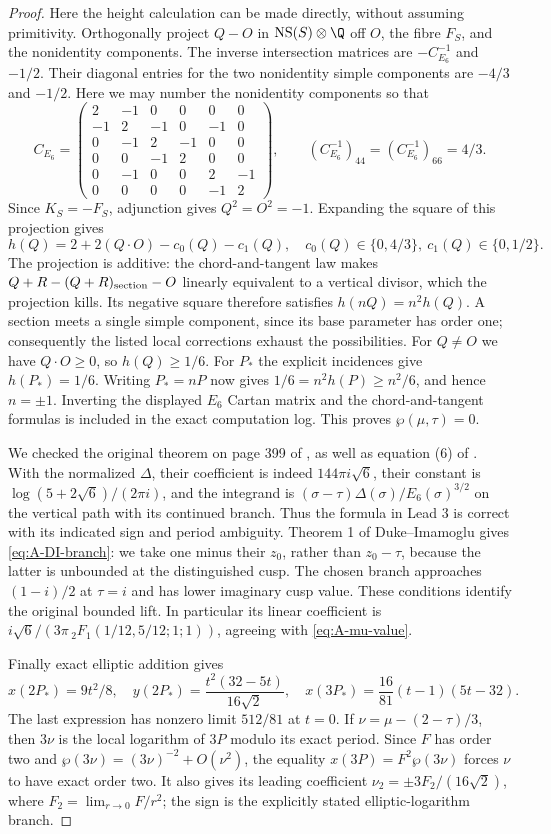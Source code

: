 \begin{proof}
Here the height calculation can be made directly, without assuming
primitivity.  Orthogonally project $Q-O$ in
$\operatorname{NS}(S)\otimes\Q$ off $O$, the fibre $F_S$, and the
nonidentity components.  The inverse intersection matrices are
$-C_{E_6}^{-1}$ and $-1/2$.  Their diagonal entries for the two
nonidentity simple components are $-4/3$ and $-1/2$.
Here we may number the nonidentity components so that
\[
C_{E_6}=\begin{pmatrix}
2&-1&0&0&0&0\\
-1&2&-1&0&-1&0\\
0&-1&2&-1&0&0\\
0&0&-1&2&0&0\\
0&-1&0&0&2&-1\\
0&0&0&0&-1&2
\end{pmatrix},\qquad
(C_{E_6}^{-1})_{44}=(C_{E_6}^{-1})_{66}=4/3.
\]
Since $K_S=-F_S$, adjunction gives $Q^2=O^2=-1$.  Expanding the
square of this projection gives
\[
h(Q)=2+2(Q\cdot O)-c_0(Q)-c_1(Q),\quad
c_0(Q)\in\{0,4/3\},\ c_1(Q)\in\{0,1/2\}.
\]
The projection is additive: the chord-and-tangent law makes
$Q+R-(Q+R)_{\rm section}-O$ linearly equivalent to a vertical
divisor, which the projection kills.  Its negative square therefore
satisfies $h(nQ)=n^2h(Q)$.  A section meets a single simple
component, since its base parameter has order one; consequently
the listed local corrections exhaust the possibilities.
For $Q\ne O$ we have $Q\cdot O\ge0$, so $h(Q)\ge1/6$.
For $P_*$ the explicit incidences give $h(P_*)=1/6$.
Writing $P_*=nP$ now gives $1/6=n^2h(P)\ge n^2/6$, and hence
$n=\pm1$.  Inverting the displayed $E_6$ Cartan matrix and the
chord-and-tangent formulas is included in the exact computation log.
This proves $\wp(\mu,\tau)=0$.

We checked the original theorem on page 399 of
\citet{EichlerZagier1982}, as well as equation (6) of
\citet{DukeImamoglu2008}.  With the normalized $\Delta$, their
coefficient is indeed $144\pi i\sqrt6$, their constant is
$\log(5+2\sqrt6)/(2\pi i)$, and the integrand is
$(\sigma-\tau)\Delta(\sigma)/E_6(\sigma)^{3/2}$ on the vertical
path with its continued branch.  Thus the formula in Lead 3 is
correct with its indicated sign and period ambiguity.  Theorem 1
of Duke--Imamoglu gives \eqref{eq:A-DI-branch}: we take one minus
their $z_0$, rather than $z_0-\tau$, because the latter is unbounded
at the distinguished cusp.  The chosen branch approaches
$(1-i)/2$ at $\tau=i$ and has lower imaginary cusp value.
These conditions identify the original bounded lift.  In particular
its linear coefficient is
$i\sqrt6/(3\pi\,{}_2F_1(1/12,5/12;1;1))$, agreeing with
\eqref{eq:A-mu-value}.

Finally exact elliptic addition gives
\[
x(2P_*)=9t^2/8,\quad
y(2P_*)=\frac{t^2(32-5t)}{16\sqrt2},\quad
x(3P_*)=\frac{16}{81}(t-1)(5t-32).
\]
The last expression has nonzero limit $512/81$ at $t=0$.
If $\nu=\mu-(2-\tau)/3$, then $3\nu$ is the local logarithm of
$3P$ modulo its exact period.  Since $F$ has order two and
$\wp(3\nu)=(3\nu)^{-2}+O(\nu^2)$, the equality
$x(3P)=F^2\wp(3\nu)$ forces $\nu$ to have exact order two.
It also gives its leading coefficient
$\nu_2=\pm3F_2/(16\sqrt2)$, where $F_2=\lim_{r\to0}F/r^2$;
the sign is the explicitly stated elliptic-logarithm branch.
\end{proof}
